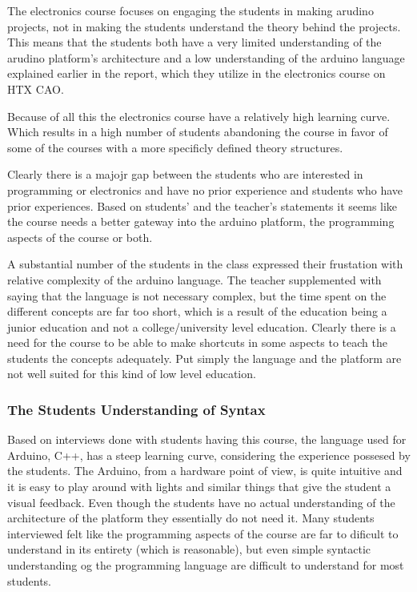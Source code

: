 The electronics course focuses on engaging the students in making arudino projects, not in making the students understand the theory behind the projects. This means that the students both have a very limited understanding of the arudino platform's architecture and a low understanding of the arduino language explained earlier in the report, which they utilize in the electronics course on HTX CAO.

Because of all this the electronics course have a relatively high learning curve. Which results in a high number of students abandoning the course in favor of some of the courses with a more specificly defined theory structures.

Clearly there is a majojr gap between the students who are interested in programming or electronics and have no prior experience and students who have prior experiences. 
Based on students' and the teacher's statements it seems like the course needs a better gateway into the arduino platform, the programming aspects of the course or both.

A substantial number of the students in the class expressed their frustation with relative complexity of the arduino language. The teacher supplemented with saying that the language is not necessary complex, but the time spent on the different concepts are far too short, which is a result of the education being a junior education and not a college/university level education.
Clearly there is a need for the course to be able to make shortcuts in some aspects to teach the students the concepts adequately. Put simply the language and the platform are not well suited for this kind of low level education.

\subsubsection{The Students Understanding of Syntax}


Based on interviews done with students having this course, the language used for Arduino, C++, has a steep learning curve, considering the experience possesed by the students. The Arduino, from a hardware point of view, is quite intuitive and it is easy to play around with lights and similar things that give the student a visual feedback. Even though the students have no actual understanding of the architecture of the platform they essentially do not need it. Many students interviewed felt like the programming aspects of the course are far to dificult to understand in its entirety (which is reasonable), but even simple syntactic understanding og the programming language are difficult to understand for most students. 
\cite{Interviews}%


